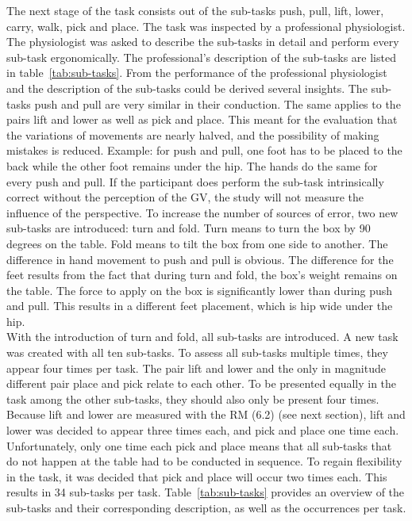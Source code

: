 The next stage of the task consists out of the sub-tasks push, pull, lift, lower, carry, walk, pick and place. The task was inspected by a professional physiologist. The physiologist was asked to describe the sub-tasks in detail and perform every sub-task ergonomically. The professional's description of the sub-tasks are listed in table~\ref{tab:sub-tasks}. From the performance of the professional physiologist and the description of the sub-tasks could be derived several insights. The sub-tasks push and pull are very similar in their conduction. The same applies to the pairs lift and lower as well as pick and place. This meant for the evaluation that the variations of movements are nearly halved, and the possibility of making mistakes is reduced. Example: for push and pull, one foot has to be placed to the back while the other foot remains under the hip. The hands do the same for every push and pull. If the participant does perform the sub-task intrinsically correct without the perception of the GV, the study will not measure the influence of the perspective. To increase the number of sources of error, two new sub-tasks are introduced: turn and fold. Turn means to turn the box by 90 degrees on the table. Fold means to tilt the box from one side to another. The difference in hand movement to push and pull is obvious. The difference for the feet results from the fact that during turn and fold, the box's weight remains on the table. The force to apply on the box is significantly lower than during push and pull. This results in a different feet placement, which is hip wide under the hip.\\
With the introduction of turn and fold, all sub-tasks are introduced. A new task was created with all ten sub-tasks. To assess all sub-tasks multiple times, they appear four times per task. The pair lift and lower and the only in magnitude different pair place and pick relate to each other. To be presented equally in the task among the other sub-tasks, they should also only be present four times. Because lift and lower are measured with the RM (6.2) (see next section), lift and lower was decided to appear three times each, and pick and place one time each. Unfortunately, only one time each pick and place means that all sub-tasks that do not happen at the table had to be conducted in sequence. To regain flexibility in the task, it was decided that pick and place will occur two times each. This results in 34 sub-tasks per task. Table~\ref{tab:sub-tasks} provides an overview of the sub-tasks and their corresponding description, as well as the occurrences per task.

